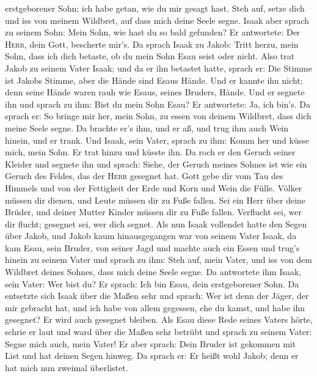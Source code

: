 erstgeborener Sohn; ich habe getan, wie du mir gesagt hast. Steh auf,
setze dich und iss von meinem Wildbret, auf dass mich deine Seele segne.
 Isaak aber sprach zu seinem Sohn: Mein Sohn, wie hast du
so bald gefunden? Er antwortete: Der \textsc{Herr}, dein Gott, bescherte
mir's.  Da sprach Isaak zu Jakob: Tritt herzu, mein Sohn,
dass ich dich betaste, ob du mein Sohn Esau seist oder nicht.
 Also trat Jakob zu seinem Vater Isaak; und da er ihn
betastet hatte, sprach er: Die Stimme ist Jakobs Stimme, aber die Hände
sind Esaus Hände.  Und er kannte ihn nicht; denn seine
Hände waren rauh wie Esaus, seines Bruders, Hände. Und er segnete ihn
 und sprach zu ihm: Bist du mein Sohn Esau? Er
antwortete: Ja, ich bin's.  Da sprach er: So bringe mir
her, mein Sohn, zu essen von deinem Wildbret, dass dich meine Seele
segne. Da brachte er's ihm, und er aß, und trug ihm auch Wein hinein,
und er trank.  Und Isaak, sein Vater, sprach zu ihm: Komm
her und küsse mich, mein Sohn.  Er trat hinzu und küsste
ihn. Da roch er den Geruch seiner Kleider und segnete ihn und sprach:
Siehe, der Geruch meines Sohnes ist wie ein Geruch des Feldes, das der
\textsc{Herr} gesegnet hat.  Gott gebe dir vom Tau des
Himmels und von der Fettigkeit der Erde und Korn und Wein die Fülle.
 Völker müssen dir dienen, und Leute müssen dir zu Fuße
fallen. Sei ein Herr über deine Brüder, und deiner Mutter Kinder müssen
dir zu Fuße fallen. Verflucht sei, wer dir flucht; gesegnet sei, wer
dich segnet.  Als nun Isaak vollendet hatte den Segen
über Jakob, und Jakob kaum hinausgegangen war von seinem Vater Isaak, da
kam Esau, sein Bruder, von seiner Jagd  und machte auch
ein Essen und trug's hinein zu seinem Vater und sprach zu ihm: Steh auf,
mein Vater, und iss von dem Wildbret deines Sohnes, dass mich deine
Seele segne.  Da antwortete ihm Isaak, sein Vater: Wer
bist du? Er sprach: Ich bin Esau, dein erstgeborener Sohn.
 Da entsetzte sich Isaak über die Maßen sehr und sprach:
Wer ist denn der Jäger, der mir gebracht hat, und ich habe von allem
gegessen, ehe du kamst, und habe ihn gesegnet? Er wird auch gesegnet
bleiben.  Als Esau diese Rede seines Vaters hörte, schrie
er laut und ward über die Maßen sehr betrübt und sprach zu seinem Vater:
Segne mich auch, mein Vater!  Er aber sprach: Dein Bruder
ist gekommen mit List und hat deinen Segen hinweg.  Da
sprach er: Er heißt wohl Jakob; denn er hat mich nun zweimal überlistet.
